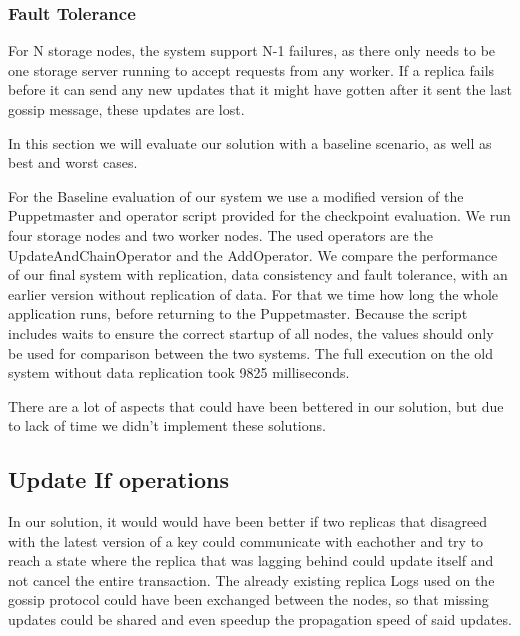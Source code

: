 \documentclass[times, 10pt,twocolumn]{article}
\begin{document}
\subsubsection{Fault Tolerance}

For N storage nodes, the system support N-1 failures, as there only needs to be one storage server running to accept requests from any worker.
If a replica fails before it can send any new updates that it might have gotten after it sent the last gossip message, these updates are lost.


In this section we will evaluate our solution with a baseline scenario, as well as best and worst cases.

For the Baseline evaluation of our system we use a modified version of the Puppetmaster and operator script provided for the checkpoint evaluation. 
We run four storage nodes and two worker nodes.
The used operators are the UpdateAndChainOperator and the AddOperator.
We compare the performance of our final system with replication, data consistency and fault tolerance, with an earlier version without replication of data.
For that we time how long the whole application runs, before returning to the Puppetmaster.
Because the script includes waits to ensure the correct startup of all nodes, the values should only be used for comparison between the two systems.
The full execution on the old system without data replication took 9825 milliseconds.



There are a lot of aspects that could have been bettered in our solution, but due to lack of time we didn't implement these solutions.

\subsection{Update If operations}

In our solution, it would would have been better if two replicas that disagreed with the latest version of a key could communicate with eachother and try to reach
a state where the replica that was lagging behind could update itself and not cancel the entire transaction. The already existing replica Logs used on the gossip protocol could have been
exchanged between the nodes, so that missing updates could be shared and even speedup the propagation speed of said updates.
\end{document}
